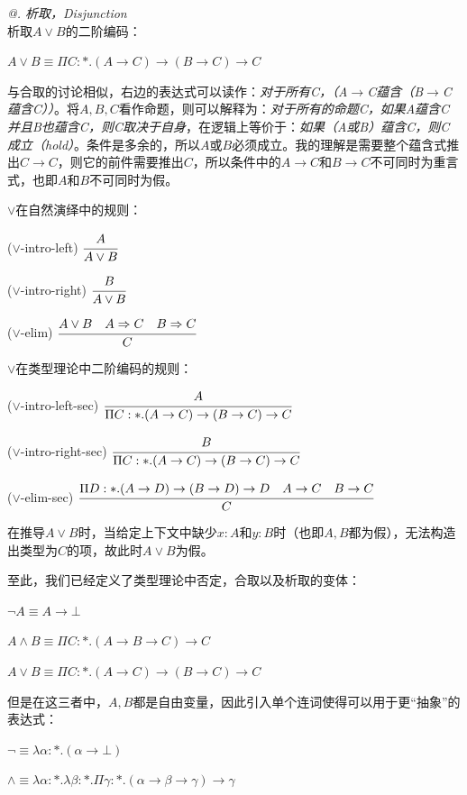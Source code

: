 \documentclass[UTF8]{article}
\makeatletter
\newcommand{\Rmnum}[1]{\expandafter\@slowromancap\romannumeral #1@}
\makeatother
\begin{document}
	\noindent
	\textit{\Rmnum{2}. 析取，Disjunction}\\
	析取$A\lor B$的二阶编码：
	
		$A\lor B\equiv\Pi C:*.(A\rightarrow C)\rightarrow(B\rightarrow C)\rightarrow C$
		
		与合取的讨论相似，右边的表达式可以读作：\textit{对于所有C，（A$\rightarrow$C蕴含（B$\rightarrow$C蕴含C））}。将$A,B,C$看作命题，则可以解释为：\textit{对于所有的命题C，如果A蕴含C并且B也蕴含C，则C取决于自身}，在逻辑上等价于：\textit{如果（A或B）蕴含C，则C成立（hold）}。条件是多余的，所以$A$或$B$必须成立。我的理解是需要整个蕴含式推出$C\rightarrow C$，则它的前件需要推出$C$，所以条件中的$A\rightarrow C$和$B\rightarrow C$不可同时为重言式，也即$A$和$B$不可同时为假。
		
		$\lor$在自然演绎中的规则：
		
		($\lor$-intro-left) $\cfrac{A}{A\lor B}$
		
		($\lor$-intro-right) $\cfrac{B}{A\lor B}$
		
		($\lor$-elim) $\cfrac{A\lor B\ \ \ A\Rightarrow C\ \ \ B\Rightarrow C}{C}$
		
		$\lor$在类型理论中二阶编码的规则：
		
		($\lor$-intro-left-sec) $\cfrac{A}{\Pi C:*.(A\rightarrow C)\rightarrow(B\rightarrow C)\rightarrow C}$
		
		($\lor$-intro-right-sec) $\cfrac{B}{\Pi C:*.(A\rightarrow C)\rightarrow(B\rightarrow C)\rightarrow C}$
		
		($\lor$-elim-sec) $\cfrac{\Pi D:*.(A\rightarrow D)\rightarrow(B\rightarrow D)\rightarrow D\ \ \ A\rightarrow C\ \ \ B\rightarrow C}{C}$
		
		在推导$A\lor B$时，当给定上下文中缺少$x:A$和$y:B$时（也即$A,B$都为假），无法构造出类型为$C$的项，故此时$A\lor B$为假。
		
		至此，我们已经定义了类型理论中否定，合取以及析取的变体：
		
		$\neg A\equiv A\rightarrow\bot$
		
		$A\land B\equiv\Pi C:*.(A\rightarrow B\rightarrow C)\rightarrow C$
		
		$A\lor B\equiv\Pi C:*.(A\rightarrow C)\rightarrow(B\rightarrow C)\rightarrow C$
		
		但是在这三者中，$A,B$都是自由变量，因此引入单个连词使得可以用于更“抽象”的表达式：
		
		$\neg\equiv\lambda\alpha:*.(\alpha\rightarrow\bot)$
		
		$\land\equiv\lambda\alpha:*.\lambda\beta:*.\Pi\gamma:*.(\alpha\rightarrow\beta\rightarrow\gamma)\rightarrow\gamma$
		
\end{document}
